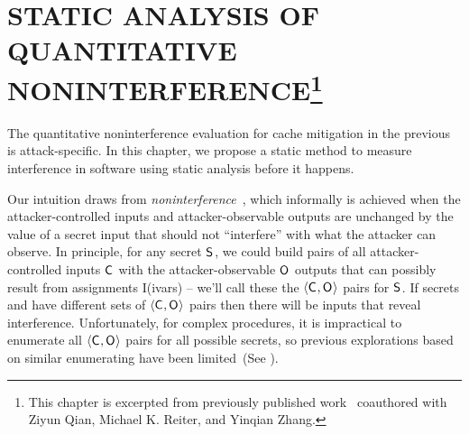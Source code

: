 \chapter[\uppercase{Static analysis of quantitative
noninterference}]{\uppercase{Static analysis of quantitative
noninterference}\protect\footnote{This chapter is excerpted from
previously published work~\cite{sscf} coauthored with Ziyun Qian,
Michael K. Reiter, and Yinqian Zhang.}}
\graphicspath{{./}{./fig/sscf/}{./fig/sscf/}{./fig/sscf/models/}}
\label{chap:sscf}
The quantitative noninterference evaluation for cache mitigation in
the previous  is attack-specific. In this
chapter, we propose a static method to measure interference in
software using static analysis before it happens. 

Our intuition draws from
\textit{noninterference}~\cite{goguen1982security}, which informally
is achieved when the attacker-controlled inputs and
attacker-observable outputs are unchanged by the value of a secret
input that should not ``interfere'' with what the attacker can
observe. In principle, for any secret $\mathsf{S}_{}$, we could build pairs
of all attacker-controlled inputs $\mathsf{C}_{}$ with the
attacker-observable $\mathsf{O}_{}$ outputs that can possibly result from
assignments I(ivars) -- we'll call these the
$\langle\mathsf{C}_{},\mathsf{O}_{}\rangle$ pairs for $\mathsf{S}_{}$. If
secrets \SecFn{} and \SecFnAlt{} have different sets of
$\langle\mathsf{C}_{},\mathsf{O}_{}\rangle$ pairs then there will be inputs that
reveal interference.  Unfortunately, for complex procedures, it is
impractical to enumerate all $\langle\mathsf{C}_{},\mathsf{O}_{}\rangle$ pairs
for all possible secrets, so previous explorations based on similar
enumerating have been limited~(See ). 
\iffalse
In principle, if all possible pairs of attacker-controlled
inputs and attacker-observable outputs could be enumerated for any
given value of the secret input, then differences in the pairs
possible for different secrets would reveal interference between the
secret value and the pairs that remain possible, and hence an estimate
for potential leakage.  Unfortunately, enumerating these pairs for all
possible secret values is often impractical for complex procedures,
and so previous explorations based on similar principles have been
limited (See \secref{sec:related:qif}).
\fi

